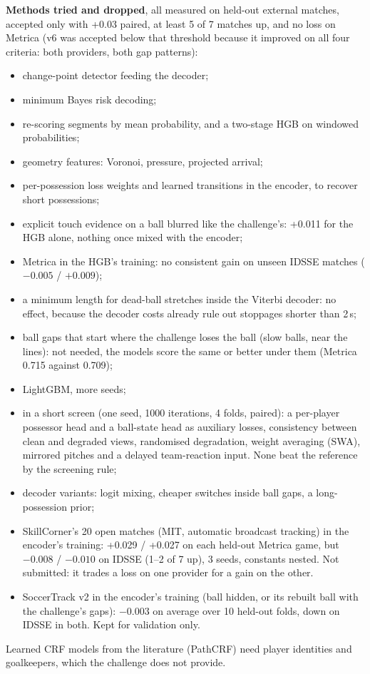\documentclass[10pt,a4paper]{article}
\begin{document}
\textbf{Methods tried and dropped}, all measured on held-out external matches, accepted only with
+0.03 paired, at least 5 of 7 matches up, and no loss on Metrica (v6 was accepted below that
threshold because it improved on all four criteria: both providers, both gap patterns):
\begin{itemize}
\item change-point detector feeding the decoder;
\item minimum Bayes risk decoding;
\item re-scoring segments by mean probability, and a two-stage HGB on windowed probabilities;
\item geometry features: Voronoi, pressure, projected arrival;
\item per-possession loss weights and learned transitions in the encoder, to recover short
  possessions;
\item explicit touch evidence on a ball blurred like the challenge's: +0.011 for the HGB alone,
  nothing once mixed with the encoder;
\item Metrica in the HGB's training: no consistent gain on unseen IDSSE matches
  ($-0.005$ / $+0.009$);
\item a minimum length for dead-ball stretches inside the Viterbi decoder: no effect, because the
  decoder costs already rule out stoppages shorter than 2\,s;
\item ball gaps that start where the challenge loses the ball (slow balls, near the lines): not
  needed, the models score the same or better under them (Metrica 0.715 against 0.709);
\item LightGBM, more seeds;
\item in a short screen (one seed, 1000 iterations, 4 folds, paired): a per-player possessor head
  and a ball-state head as auxiliary losses, consistency between clean and degraded views,
  randomised degradation, weight averaging (SWA), mirrored pitches and a delayed team-reaction
  input. None beat the reference by the screening rule;
\item decoder variants: logit mixing, cheaper switches inside ball gaps, a long-possession prior;
\item SkillCorner's 20 open matches (MIT, automatic broadcast tracking) in the encoder's training:
  +0.029 / +0.027 on each held-out Metrica game, but $-0.008$ / $-0.010$ on IDSSE (1--2 of 7 up),
  3 seeds, constants nested. Not submitted: it trades a loss on one provider for a gain on the
  other.
\item SoccerTrack v2 in the encoder's training (ball hidden, or its rebuilt ball with the
  challenge's gaps): $-0.003$ on average over 10 held-out folds, down on IDSSE in both. Kept for
  validation only.
\end{itemize}
Learned CRF models from the literature (PathCRF) need player identities and goalkeepers, which the
challenge does not provide.
\end{document}
